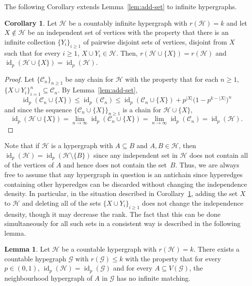 \documentclass[11pt,reqno]{amsart}
\theoremstyle{definition}
\newtheorem{lemma}[theorem]{Lemma}
\newtheorem{corollary}[theorem]{Corollary}
\begin{document}
The following Corollary extends Lemma~\ref{lem:add-set} to infinite hypergraphs.

\begin{corollary}\label{cor:inf-match}
Let $\mathcal{H}$ be a countably infinite hypergraph with $r(\mathcal{H}) = k$ and let $X \notin \mathcal{H}$ be an independent set of vertices with the property that there is an infinite collection $\{Y_i\}_{i\geq 1}$ of pairwise disjoint sets of vertices, disjoint from $X$ such that for every $i \geq 1$, $X \cup Y_i \in \mathcal{H}$. Then, $r(\mathcal{H} \cup \{X\}) = r(\mathcal{H})$ and ${\operatorname{id}}_p(\mathcal{H}\cup \{X\}) = {\operatorname{id}}_p(\mathcal{H})$.
\end{corollary}
\begin{proof}
Let $\{\mathcal{C}_n\}_{n \geq 1}$ be any chain for $\mathcal{H}$ with the property that for each $n \geq 1$, $\{X \cup Y_i\}_{i = 1}^n \subseteq \mathcal{C}_n$. By Lemma~\ref{lem:add-set},
\[
 {\operatorname{id}}_p(\mathcal{C}_n \cup \{X\}) \leq {\operatorname{id}}_p(\mathcal{C}_n) \leq {\operatorname{id}}_p(\mathcal{C}_n \cup \{X\}) + p^{|X|}\big(1 - p^{k-|X|} \big)^n
\]
and since the sequence $\{\mathcal{C}_n \cup \{X\}\}_{n \geq 1}$ is a chain for $\mathcal{H} \cup \{X\}$,
\[
 {\operatorname{id}}_p(\mathcal{H} \cup \{X\}) = \lim_{n \to \infty} {\operatorname{id}}_p(\mathcal{C}_n \cup \{X\}) = \lim_{n \to \infty} {\operatorname{id}}_p(\mathcal{C}_n) = {\operatorname{id}}_p(\mathcal{H}).
\]
\end{proof}

Note that if $\mathcal{H}$ is a hypergraph with $A \subseteq B$ and $A, B \in \mathcal{H}$, then ${\operatorname{id}}_p(\mathcal{H}) = {\operatorname{id}}_p(\mathcal{H} \setminus \{B\})$ since any independent set in $\mathcal{H}$ does not contain all of the vertices of $A$ and hence does not contain the set~$B$. Thus, we are always free to assume that any hypergraph in question is an antichain since hyperedges containing other hyperedges can be discarded without changing the independence density. In particular, in the situation described in Corollary~\ref{cor:inf-match}, adding the set $X$ to $\mathcal{H}$ and deleting all of the sets $\{X \cup Y_i\}_{i \geq 1}$ does not change the independence density, though it may decrease the rank.  The fact that this can be done simultaneously for all such sets in a consistent way is described in the following lemma.

\begin{lemma}\label{lem:no-inf-match}
Let $\mathcal{H}$ be a countable hypergraph with $r(\mathcal{H}) = k$.  There exists a countable hypegraph $\mathcal{G}$ with $r(\mathcal{G}) \leq k$ with the property that for every $p \in (0,1)$, ${\operatorname{id}}_p(\mathcal{H}) = {\operatorname{id}}_p(\mathcal{G})$ and for every $A \subseteq V(\mathcal{G})$, the neighbourhood hypergraph of $A$ in $\mathcal{G}$ has no infinite matching.
\end{lemma}
\end{document}
